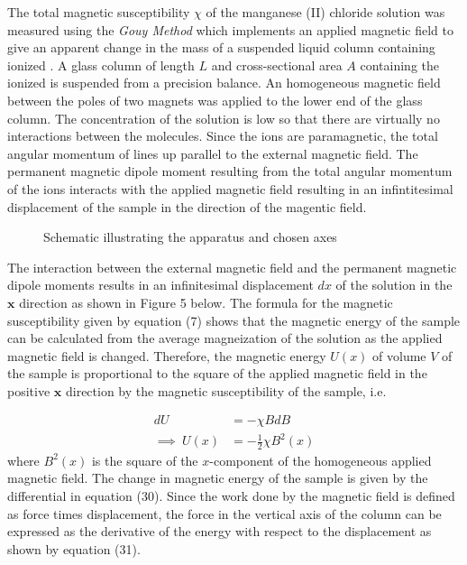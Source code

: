 \documentclass[a4paper,11pt]{article}
\begin{document}
The total magnetic susceptibility $\chi$ of the manganese (II) chloride solution was measured using the \textit{Gouy Method} which implements an applied magnetic field to give an apparent change in the mass of a suspended liquid column containing ionized . A glass column of length $L$ and cross-sectional area $A$ containing the ionized  is suspended from a precision balance. An homogeneous magnetic field between the poles of two magnets was applied to the lower end of the glass column. The concentration of the solution is low so that there are virtually no interactions between the molecules. Since the  ions are paramagnetic, the total angular momentum of lines up parallel to the external magnetic field\cite{mohling1982}. The permanent magnetic dipole moment resulting from the total angular momentum of the ions interacts with the applied magnetic field resulting in an infintitesimal displacement of the sample in the direction of the magentic field.

\begin{figure}
{}
\caption{Schematic illustrating the apparatus and chosen axes}
\label{Fig:4}
\end{figure}

The interaction between the external magnetic field and the permanent magnetic dipole moments results in an infinitesimal displacement $dx$ of the solution in the $\mathbf{x}$ direction as shown in Figure 5 below. The formula for the magnetic susceptibility given by equation (7) shows that the magnetic energy of the sample can be calculated from the average magneization of the solution as the applied magnetic field is changed. Therefore, the magnetic energy $U(x)$ of volume $V$ of the sample is proportional to the square of the applied magnetic field in the positive $\mathbf{x}$ direction by the magnetic susceptibility of the sample, i.e.

\begin{align}
dU	& = - \chi B dB\nonumber\\
\implies~U(x)	& = -\frac{1}{2} \chi B^2(x)\nonumber
\end{align}
where $B^2(x)$ is the square of the $x$-component of the homogeneous applied magnetic field. The change in magnetic energy of the sample is given by the differential in equation (30). Since the work done by the magnetic field is defined as force times displacement, the force in the vertical axis of the column can be expressed as the derivative of the energy with respect to the displacement as shown by equation (31).
\end{document}
